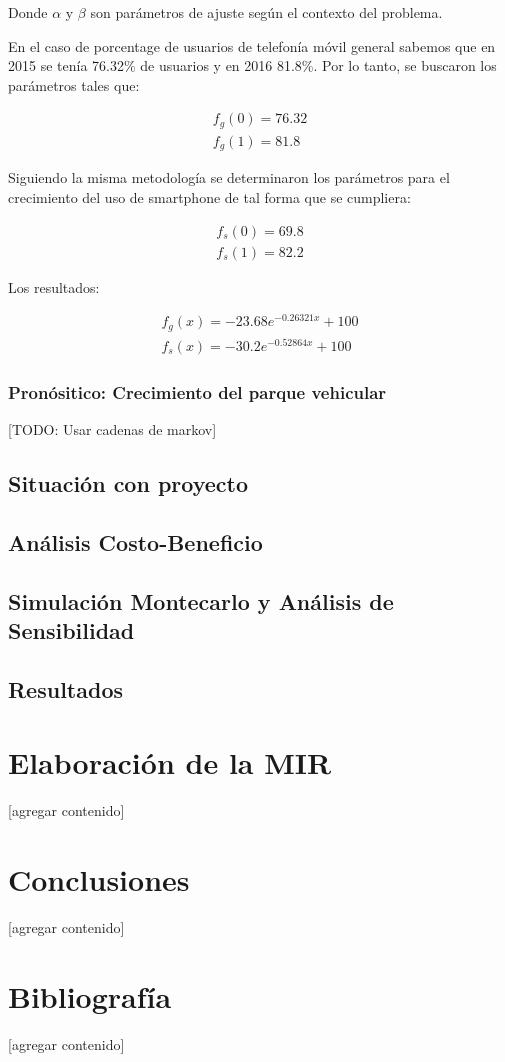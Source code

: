 \documentclass{article}
\begin{document}
Donde $\alpha$ y $\beta$ son parámetros de ajuste según el contexto del problema.

En el caso de porcentage de usuarios de telefonía móvil general sabemos que en 2015 se tenía 76.32\% de usuarios y
en 2016 81.8\%. Por lo tanto, se buscaron los parámetros tales que:

\begin{align*}
f_g(0) = 76.32 \\
f_g(1) = 81.8
\end{align*}

Siguiendo la misma metodología se determinaron los parámetros para el crecimiento del uso de smartphone de tal forma
que se cumpliera:

\begin{align*}
f_s(0) = 69.8 \\
f_s(1) = 82.2
\end{align*}

Los resultados:

\begin{align*}
f_g(x) = -23.68e^{-0.26321x}+100 \\
f_s(x) = -30.2e^{-0.52864x}+100
\end{align*}



\subsubsection{Pronósitico: Crecimiento del parque vehicular}

[TODO: Usar cadenas de markov]


\subsection{Situación con proyecto}


\subsection{Análisis Costo-Beneficio}
% 
% 

\subsection{Simulación Montecarlo y Análisis de Sensibilidad}

\subsection{Resultados}
% 
% 

\newpage
\section{Elaboración de la MIR}\label{sec:mir}
[agregar contenido]

\newpage
\section{Conclusiones}\label{sec:conclutions}
[agregar contenido]

\newpage
\section{Bibliografía}\label{sec:references}
[agregar contenido]
\end{document}
